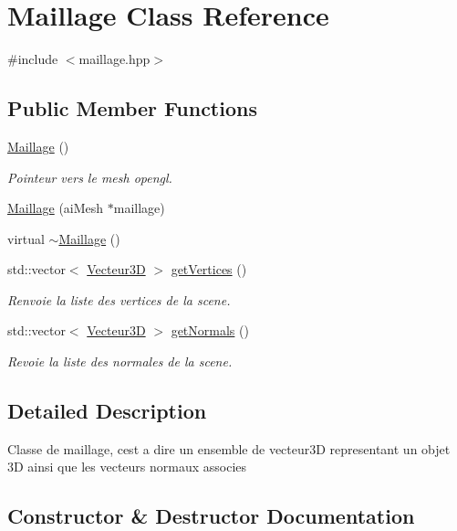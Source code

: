 \hypertarget{class_maillage}{}\section{Maillage Class Reference}
\label{class_maillage}


{\ttfamily \#include $<$maillage.\+hpp$>$}

\subsection*{Public Member Functions}
\begin{DoxyCompactItemize}
\item 
\hyperlink{class_maillage_a296104d8e2eacc14ed75a6410c00ba59}{Maillage} ()
\begin{DoxyCompactList}\small\item\em Pointeur vers le mesh opengl. \end{DoxyCompactList}\item 
\hyperlink{class_maillage_ad0d19d31a998c63802c6b6eeb4390894}{Maillage} (ai\+Mesh $\ast$maillage)
\item 
virtual \hyperlink{class_maillage_a6920b6d80a055589e19c684a924f1b0f}{$\sim$\+Maillage} ()
\item 
std\+::vector$<$ \hyperlink{class_vecteur3_d}{Vecteur3D} $>$ \hyperlink{class_maillage_ad77833666dce6bc9853c5b900d6a5da1}{get\+Vertices} ()
\begin{DoxyCompactList}\small\item\em Renvoie la liste des vertices de la scene. \end{DoxyCompactList}\item 
std\+::vector$<$ \hyperlink{class_vecteur3_d}{Vecteur3D} $>$ \hyperlink{class_maillage_a979dfc1cbfde99689d8784af28d71cc6}{get\+Normals} ()
\begin{DoxyCompactList}\small\item\em Revoie la liste des normales de la scene. \end{DoxyCompactList}\end{DoxyCompactItemize}


\subsection{Detailed Description}
Classe de maillage, c\textquotesingle{}est a dire un ensemble de vecteur3D representant un objet 3D ainsi que les vecteurs normaux associes 

\subsection{Constructor \& Destructor Documentation}
